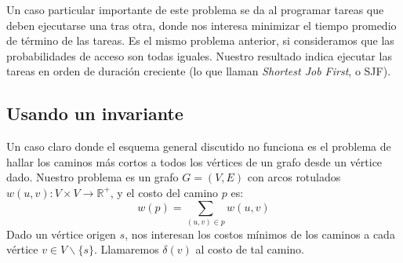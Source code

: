   Un caso particular importante de este problema
  se da al programar tareas que deben ejecutarse una tras otra,
  donde nos interesa minimizar el tiempo promedio de término de las tareas.
  Es el mismo problema anterior,
  si consideramos que las probabilidades de acceso son todas iguales.
  Nuestro resultado indica ejecutar las tareas en orden de duración creciente
  (lo que llaman \emph{\foreignlanguage{english}{Shortest Job First}},
   o SJF).

\subsection{Usando un invariante}
\label{sec:greedy-invariante}

  Un caso claro donde el esquema general discutido no funciona
  es el problema de hallar los caminos más cortos
  a todos los vértices de un grafo
  desde un vértice dado.
  Nuestro problema es un grafo \(G = (V, E)\)
  con arcos rotulados \(w(u,v) \colon V \times V \to \mathbb{R}^+\),
  y el costo del camino \(p\) es:
  \begin{equation*}
    w(p)
      = \sum_{(u, v) \in p} w(u, v)
  \end{equation*}
  Dado un vértice origen \(s\),
  nos interesan los costos mínimos de los caminos
  a cada vértice \(v \in V \smallsetminus \{s\}\).
  Llamaremos \(\delta(v)\) al costo de tal camino.

